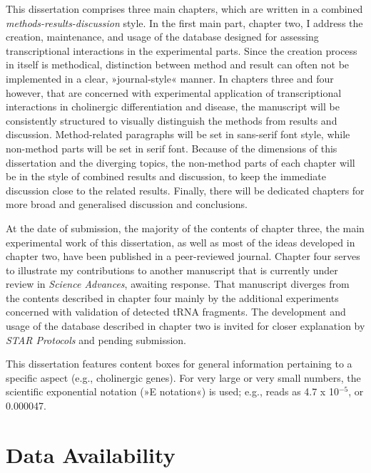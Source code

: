 
This dissertation comprises three main chapters, which are written in a combined \emph{methods-results-discussion} style. In the first main part, chapter two, I address the creation, maintenance, and usage of the database designed for assessing transcriptional interactions in the experimental parts. Since the creation process in itself is methodical, distinction between method and result can often not be implemented in a clear, »journal-style« manner. In chapters three and four however, that are concerned with experimental application of transcriptional interactions in cholinergic differentiation and disease, the manuscript will be consistently structured to visually distinguish the methods from results and discussion. Method-related paragraphs will be set in sans-serif font style, while non-method parts will be set in serif font. Because of the dimensions of this dissertation and the diverging topics, the non-method parts of each chapter will be in the style of combined results and discussion, to keep the immediate discussion close to the related results. Finally, there will be dedicated chapters for more broad and generalised discussion and conclusions.

At the date of submission, the majority of the contents of chapter three, the main experimental work of this dissertation, as well as most of the ideas developed in chapter two, have been published in a peer-reviewed journal.\cite{Lobentanzer2019a} Chapter four serves to illustrate my contributions to another manuscript that is currently under review in \emph{Science Advances}, awaiting response.\cite{Winek2020} That manuscript diverges from the contents described in chapter four mainly by the additional experiments concerned with validation of detected tRNA fragments. The development and usage of the database described in chapter two is invited for closer explanation by \emph{STAR Protocols} and pending submission.\cite{Lobentanzer2020}

This dissertation features content boxes for general information pertaining to a specific aspect (e.g., cholinergic genes). For very large or very small numbers, the scientific exponential notation (»E notation«) is used; e.g.,  reads as 4.7 x 10$^{-5}$, or 0.000047.

\newpage
\chapter*{Data Availability}
